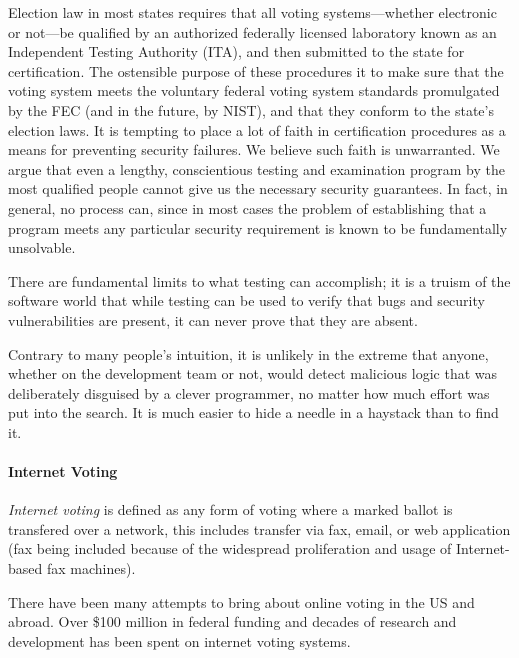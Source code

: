 \begin{displayquote}
   Election law in most states requires that all voting systems—whether
   electronic or not—be qualified by an authorized federally licensed laboratory
   known as an Independent Testing Authority (ITA), and then submitted to the
   state for certification. The ostensible purpose of these procedures it to
   make sure that the voting system meets the voluntary federal voting system
   standards promulgated by the FEC (and in the future, by NIST), and that they
   conform to the state’s election laws. It is tempting to place a lot of faith
   in certification procedures as a means for preventing security failures. We
   believe such faith is unwarranted. We argue that even a lengthy,
   conscientious testing and examination program by the most qualified people
   cannot give us the necessary security guarantees. In fact, in general, no
   process can, since in most cases the problem of establishing that a program
   meets any particular security requirement is known to be fundamentally
   unsolvable.
\end{displayquote}

\begin{displayquote}
   There are fundamental limits to what testing can accomplish; it is a truism
   of the software world that while testing can be used to verify that bugs and
   security vulnerabilities are present, it can never prove that they are
   absent.
\end{displayquote}

\begin{displayquote}
   Contrary to many people’s intuition, it is unlikely in the extreme that
   anyone, whether on the development team or not, would detect malicious logic
   that was deliberately disguised by a clever programmer, no matter how much
   effort was put into the search. It is much easier to hide a needle in a
   haystack than to find it.
\end{displayquote}

\paragraph{Internet Voting}
\emph{Internet voting} is defined as any form of voting where a marked ballot is
transfered over a network, this includes transfer via fax, email, or web
application (fax being included because of the widespread proliferation and
usage of Internet-based fax machines).

There have been many attempts to bring about online voting in the US and abroad.
Over \$100 million in federal funding and decades of research and development
has been spent on internet voting systems.

